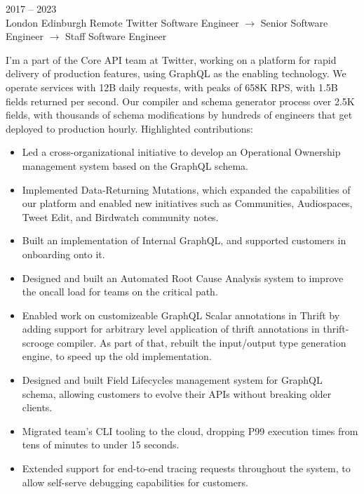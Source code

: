\documentclass[9pt]{developercv} %
\begin{document}
\begin{entrylist}
	\entry
		{2017 -- 2023\\\footnotesize{London \newline Edinburgh \newline Remote}}
		{Twitter}
		{Software Engineer $\rightarrow$ Senior Software Engineer $\rightarrow$ Staff Software Engineer}
		{
			I'm a part of the Core API team at Twitter, working on a platform for rapid delivery of production features, using GraphQL as the enabling technology. We operate services with 12B daily requests, with peaks of 658K RPS, with 1.5B fields returned per second. Our compiler and schema generator process over 2.5K fields, with thousands of schema modifications by hundreds of engineers that get deployed to production hourly.\newline\newline
			Highlighted contributions:\newline\newline
			\begin{itemize}
				\item Led a cross-organizational initiative to develop an Operational Ownership management system based on the GraphQL schema.
				\item Implemented Data-Returning Mutations, which expanded the capabilities of our platform and enabled new initiatives such as Communities, Audiospaces, Tweet Edit, and Birdwatch community notes.
				\item Built an implementation of Internal GraphQL, and supported customers in onboarding onto it.
				\item Designed and built an Automated Root Cause Analysis system to improve the oncall load for teams on the critical path.
				\item Enabled work on customizeable GraphQL Scalar annotations in Thrift by adding support for arbitrary level application of thrift annotations in thrift-scrooge compiler. As part of that, rebuilt the input/output type generation engine, to speed up the old implementation.
				\item Designed and built Field Lifecycles management system for GraphQL schema, allowing customers to evolve their APIs without breaking older clients.
				\item Migrated team's CLI tooling to the cloud, dropping P99 execution times from tens of minutes to under 15 seconds.
				\item Extended support for end-to-end tracing requests throughout the system, to allow self-serve debugging capabilities for customers.

\end{itemize}}
\end{entrylist}
\end{document}
